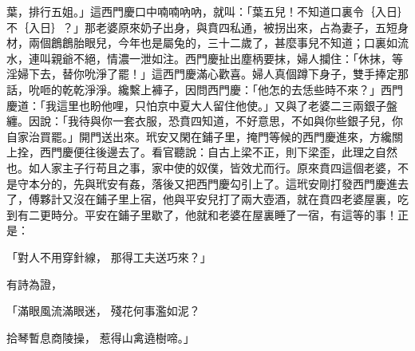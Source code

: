 葉，排行五姐。」這西門慶口中喃喃吶吶，就叫：「葉五兒！不知道口裏令｛入日｝不｛入日｝？」那老婆原來奶子出身，與賁四私通，被拐出來，占為妻子，五短身材，兩個鶬鶬胎眼兒，今年也是屬兔的，三十二歲了，甚麼事兒不知道；口裏如流水，連叫親爺不絕，情濃一泄如注。西門慶扯出塵柄要抹，婦人攔住：「休抹，等淫婦下去，替你吮淨了罷！」這西門慶滿心歡喜。婦人真個蹲下身子，雙手捧定那話，吮咂的乾乾淨淨。纔繫上褲子，因問西門慶：「他怎的去恁些時不來？」西門慶道：「我這里也盼他哩，只怕京中夏大人留住他使。」又與了老婆二三兩銀子盤纏。因說：「我待與你一套衣服，恐賁四知道，不好意思，不如與你些銀子兒，你自家治買罷。」開門送出來。玳安又閑在鋪子里，掩門等候的西門慶進來，方纔關上拴，西門慶便往後邊去了。看官聽說：自古上梁不正，則下梁歪，此理之自然也。如人家主子行苟且之事，家中使的奴僕，皆效尤而行。原來賁四這個老婆，不是守本分的，先與玳安有姦，落後又把西門慶勾引上了。這玳安剛打發西門慶進去了，傅夥計又沒在鋪子里上宿，他與平安兒打了兩大壺酒，就在賁四老婆屋裏，吃到有二更時分。平安在鋪子里歇了，他就和老婆在屋裏睡了一宿，有這等的事！正是：

「對人不用穿針線，  那得工夫送巧來？」

有詩為證，

「滿眼風流滿眼迷，  殘花何事濫如泥？

拾琴暫息商陵操，  惹得山禽遶樹啼。」

